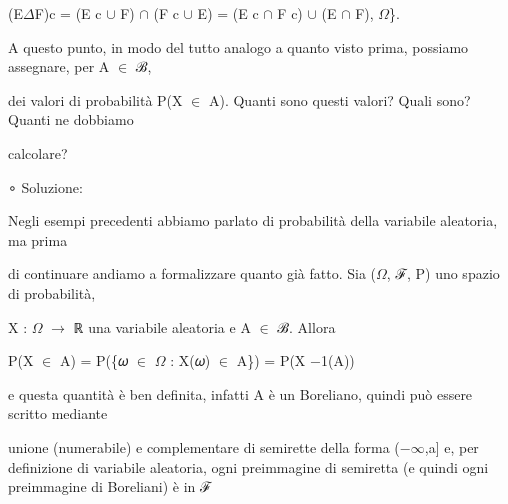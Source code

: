 \documentclass[a4paper,portrait,12pt]{article}
\begin{document}
\begin{flushleft}
(E$\Delta$F)c = (E c $\cup$ F) $\cap$ (F c $\cup$ E) = (E c $\cap$ F c) $\cup$ (E $\cap$ F), $\Omega$\}.
\end{flushleft}


\begin{flushleft}
A questo punto, in modo del tutto analogo a quanto visto prima, possiamo assegnare, per A $\in$ ℬ,
\end{flushleft}


\begin{flushleft}
dei valori di probabilit\`{a} P(X $\in$ A). Quanti sono questi valori? Quali sono? Quanti ne dobbiamo
\end{flushleft}


\begin{flushleft}
calcolare?
\end{flushleft}


\begin{flushleft}
∘ Soluzione:
\end{flushleft}


\begin{flushleft}
Negli esempi precedenti abbiamo parlato di probabilit\`{a} della variabile aleatoria, ma prima
\end{flushleft}


\begin{flushleft}
di continuare andiamo a formalizzare quanto gi\`{a} fatto. Sia ($\Omega$, ℱ, P) uno spazio di probabilit\`{a},
\end{flushleft}


\begin{flushleft}
X : $\Omega$ $\rightarrow$ ℝ una variabile aleatoria e A $\in$ ℬ. Allora
\end{flushleft}


\begin{flushleft}
P(X $\in$ A) = P(\{𝜔 $\in$ $\Omega$ : X(𝜔) $\in$ A\}) = P(X $-$1(A))
\end{flushleft}


\begin{flushleft}
e questa quantit\`{a} \`{e} ben definita, infatti A \`{e} un Boreliano, quindi pu\`{o} essere scritto mediante
\end{flushleft}


\begin{flushleft}
unione (numerabile) e complementare di semirette della forma ($-$$\infty$,a] e, per definizione di variabile aleatoria, ogni preimmagine di semiretta (e quindi ogni preimmagine di Boreliani) \`{e} in ℱ
\end{flushleft}
\end{document}

